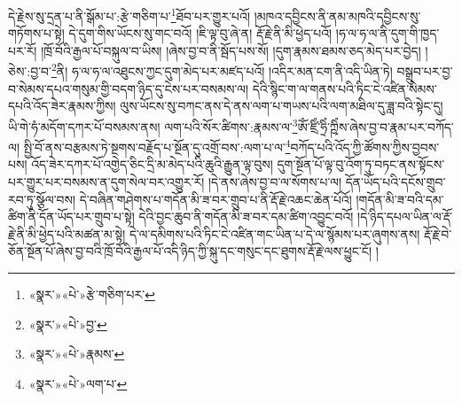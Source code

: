 དེ་རྗེས་སུ་དྲན་པ་ནི་སྒོམ་པ་:རྩེ་གཅིག་པ་\footnote{«སྣར་»«པེ་»རྩེ་གཅིག་པར་}ཐོབ་པར་གྱུར་པའོ། །མཁའ་དབྱིངས་ནི་ནམ་མཁའི་དབྱིངས་སུ་གཏོགས་པ་སྟེ། དེ་དུག་གིས་ཡོངས་སུ་གང་བའོ། །ཇི་ལྟ་བུ་ཞེ་ན། རྡོ་རྗེ་ནི་མི་ཕྱེད་པའོ། །ཧ་ལ་ཧ་ལ་ནི་དུག་གི་ཁྱད་པར་རོ། །ཁྲོ་བོའི་རྒྱལ་པོ་བསྐུལ་བ་ཡིས། །ཞེས་བྱ་བ་ནི་སྦོད་པས་སོ། །དུག་རྣམས་ཐམས་ཅད་མེད་པར་བྱེད། །ཅེས་:བྱ་བ་\footnote{«སྣར་»«པེ་»བྱ་}ནི། ཧ་ལ་ཧ་ལ་འཐུངས་ཀྱང་དུག་མེད་པར་མཛད་པའོ། །འདིར་མན་ངག་ནི་འདི་ཡིན་ཏེ། བསྒྲུབ་པར་བྱ་བ་སེམས་དཔའ་གསུམ་གྱི་བདག་ཉིད་དུ་ངེས་པར་བསམས་ལ། དེའི་སྙིང་ག་ལ་གནས་པའི་ཏིང་ངེ་འཛིན་སེམས་དཔའི་འོད་ཟེར་རྣམས་ཀྱིས། ལུས་ཡོངས་སུ་བཀང་ནས་དེ་ནས་ལག་པ་གཡས་པའི་ལག་མཐིལ་དུ་ཟླ་བའི་སྟེང་དུ། ཡི་གེ་ཧཾ་མདོག་དཀར་པོ་བསམས་ནས། ལག་པའི་སོར་ཚིགས་:རྣམས་ལ་\footnote{«སྣར་»«པེ་»རྣམས་}ཨོཾ་ཛྲིཾ་ཧྲིཾ་ཀྵིཾས་ཞེས་བྱ་བ་རྣམ་པར་བཀོད་ལ། སྤྱི་བོ་ནས་བརྩམས་ཏེ་སྔགས་བརྗོད་པ་སྔོན་དུ་འགྲོ་བས་:ལག་པ་ལ་\footnote{«སྣར་»«པེ་»ལག་པ་}བཀོད་པའི་འོད་ཀྱི་ཚོགས་ཀྱིས་བྱབས་པས། འོད་ཟེར་དཀར་པོ་འགྱེད་ཅིང་དྲི་མ་མེད་པའི་ཆུའི་རྒྱུན་ལྟ་བུས། དུག་སྔོན་པོ་ལྟ་བུ་འོག་ཏུ་བཏང་ནས་སྟོངས་པར་གྱུར་པར་བསམས་ན་དུག་སེལ་བར་འགྱུར་རོ། །དེ་ནས་ཞེས་བྱ་བ་ལ་སོགས་པ་ལ། དོན་ཡོད་པའི་དངོས་གྲུབ་རབ་ཏུ་སྩོལ་བས། དེ་བཞིན་གཤེགས་པ་གདོན་མི་ཟ་བར་གྲུབ་པ་ནི་རྡོ་རྗེ་འཆང་ཆེན་པོའོ། །གདོན་མི་ཟ་བའི་དམ་ཚིག་ནི་དོན་ཡོད་པར་གྲུབ་པ་སྟེ། དེའི་བྱང་ཆུབ་ནི་གདོན་མི་ཟ་བར་དམ་ཚིག་འབྱུང་བའོ། །དེ་ཉིད་དཔལ་ཡིན་ལ་རྡོ་རྗེ་ནི་མི་ཕྱེད་པའི་མཚན་མ་སྟེ། དེ་ལ་དམིགས་པའི་ཏིང་ངེ་འཛིན་གང་ཡིན་པ་དེ་ལ་སྙོམས་པར་ཞུགས་ནས། རྡོ་རྗེ་བེ་ཅོན་སྔོན་པོ་ཞེས་བྱ་བའི་ཁྲོ་བོའི་རྒྱལ་པོ་འདི་ཉིད་ཀྱི་སྐུ་དང་གསུང་དང་ཐུགས་རྡོ་རྗེ་ལས་ཕྱུང་ངོ། །
